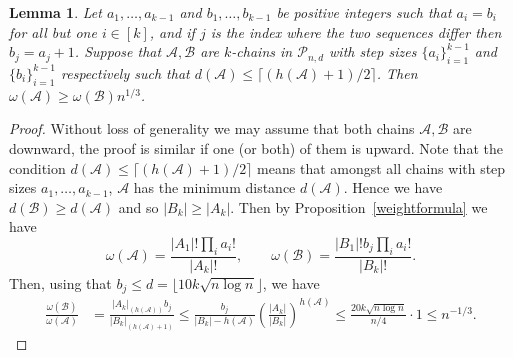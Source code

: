 \documentclass[12pt]{article}
\newtheorem{lemma}[theorem]{Lemma}
\numberwithin{equation}{section}
\def\A{\mathcal{A}}
\def\B{\mathcal{B}}
\def\P{\mathcal{P}}
\def\w{\omega}
\begin{document}
\begin{lemma}\label{weightsdecreaselittle2}Let $a_1,\ldots,a_{k-1}$ and $b_1,\ldots,b_{k-1}$ be positive integers such that $a_i=b_i$ for all but one $i\in [k]$, and if $j$ is the index where the two sequences differ then $b_j=a_j+1$. Suppose that $\A,\B$ are $k$-chains in $\P_{n,d}$ with step sizes $\{a_i\}_{i=1}^{k-1}$ and $\{b_i\}_{i=1}^{k-1}$ respectively such that $d(\A)\leq \lceil (h(\A)+1)/2 \rceil$. Then $\w(\A)\geq \w(\B) n^{1/3}$.
\end{lemma}
\begin{proof}
Without loss of generality we may assume that both chains $\A,\B$ are downward, the proof is similar if one (or both) of them is upward. Note that the condition $d(\A)\leq \lceil (h(\A)+1)/2 \rceil$ means that amongst all chains with step sizes $a_1,\ldots,a_{k-1}$, $\A$ has the minimum distance $d(\A)$. Hence we have $d(\B)\geq d(\A)$ and so $|B_k|\geq |A_k|$. Then by Proposition~\ref{weightformula} we have 
$$\w(\A)=\frac{|A_1|!\prod_i a_i!}{|A_k|!}, \qquad \w(\B)=\frac{|B_1|! b_j \prod_i a_i!}{|B_k|!}.$$
Then, using that $b_j\leq d=\lfloor 10k\sqrt{n\log n}\rfloor$, we have
\begin{equation*}
\begin{split}
\frac{\w(\B)}{\w(\A)}&=\frac{|A_k|_{(h(\A))}b_j}{|B_k|_{(h(\A)+1)}}\leq \frac{b_j}{|B_k|-h(\A)}\left(\frac{|A_k|}{|B_k|}\right)^{h(\A)}\leq \frac{20k\sqrt{n\log n}}{n/4}\cdot 1\leq n^{-1/3}.
\end{split}
\end{equation*}
\end{proof}
\end{document}
